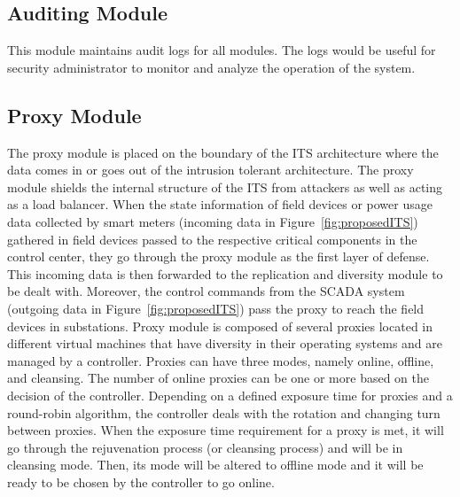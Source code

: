 \documentclass[preprint,number,12pt]{elsarticle}
\begin{document}
\subsection{Auditing Module}
This module maintains audit logs for all modules. The logs would be useful for security administrator to monitor and analyze the operation of the system. 
\subsection{Proxy Module}
The proxy module is placed on the boundary of the ITS architecture where the data comes in or goes out of the intrusion tolerant architecture. The proxy module shields the internal structure of the ITS from attackers as well as acting as a load balancer. When the state information of field devices or power usage data collected by smart meters (incoming data in Figure~\ref{fig:proposedITS}) gathered in field devices passed to the respective critical components in the control center, they go through the proxy module as the first layer of defense. This incoming data is then forwarded to the replication and diversity module to be dealt with. Moreover, the control commands from the SCADA system (outgoing data in Figure~\ref{fig:proposedITS}) pass the proxy to reach the field devices in substations. Proxy module is composed of several proxies located in different virtual machines that have diversity in their operating systems and are managed by a controller. Proxies can have three modes, namely online, offline, and cleansing. The number of online proxies can be one or more based on the decision of the controller. Depending on a defined exposure time for proxies and a round-robin algorithm, the controller deals with the rotation and changing turn between proxies\citep{Bangalore2009a}. When the exposure time requirement for a proxy is met, it will go through the rejuvenation process (or cleansing process) and will be in cleansing mode. Then, its mode will be altered to offline mode and it will be ready to be chosen by the controller to go online.
\end{document}
